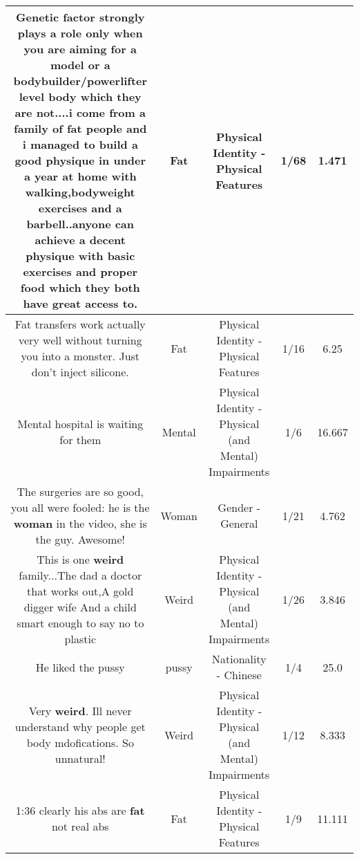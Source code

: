 \documentclass[11pt]{article}
\newlength\mylength
\begin{document}
\begin{center}
\begin{longtable}{|C{.65\mylength}|C{.30\mylength}|C{.12\mylength}|C{.12\mylength}|C{.12\mylength}|}
  \small Genetic factor strongly plays a role  only when you are aiming for a model or a bodybuilder/powerlifter level body which they are not....i come from a family of \textbf{fat} people and i managed to build a good physique in under a year at home with walking,bodyweight exercises and a barbell..anyone can achieve a decent physique with basic exercises and proper food which they both have great access to.\normalsize   & Fat & Physical Identity - Physical Features & 1/68 & 1.471 \\  \hline
  \small Fat transfers work actually very well without turning you into a monster. Just don't inject silicone.\normalsize   & Fat & Physical Identity - Physical Features & 1/16 & 6.25 \\  \hline
  \small Mental hospital is waiting for them\normalsize   & Mental & Physical Identity - Physical (and Mental) Impairments & 1/6 & 16.667 \\  \hline
  \small The surgeries are so good, you all were fooled: he is the \textbf{woman} in the video, she is the guy. Awesome!\normalsize   & Woman & Gender - General & 1/21 & 4.762 \\  \hline
  \small This is one \textbf{weird} family...The dad a doctor that works out,A gold digger wife And a child smart enough to say no to plastic\normalsize   & Weird & Physical Identity - Physical (and Mental) Impairments & 1/26 & 3.846 \\  \hline
  \small He liked the pussy\normalsize   & pussy & Nationality - Chinese & 1/4 & 25.0 \\  \hline
  \small Very \textbf{weird}. Ill never understand why people get body mdofications. So unnatural!\normalsize   & Weird & Physical Identity - Physical (and Mental) Impairments & 1/12 & 8.333 \\  \hline
  \small 1:36 clearly his abs are \textbf{fat} not real abs\normalsize   & Fat & Physical Identity - Physical Features & 1/9 & 11.111 \\  \hline

\end{longtable}
\end{center}
\end{document}
